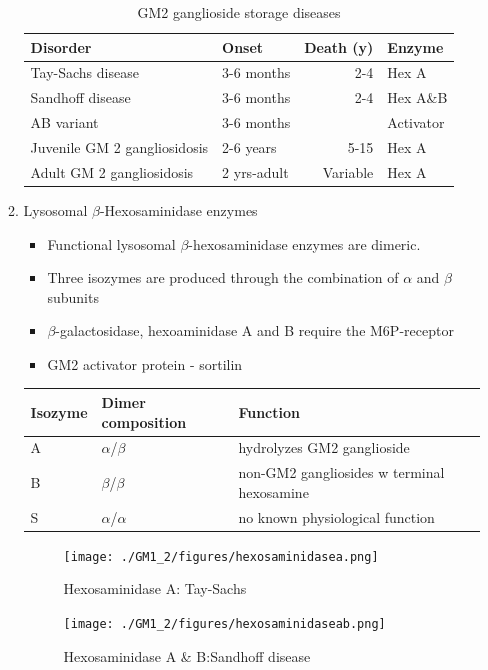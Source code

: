 \documentclass{scrartcl}
\begin{document}
\begin{enumerate}
\begin{enumerate}
\begin{table}[htbp]
\caption{\label{tab:org30b9d05}
GM2 ganglioside storage diseases}
\centering
\begin{tabular}{llrl}
Disorder & Onset & Death (y) & Enzyme\\
\hline
Tay-Sachs disease & 3-6 months & 2-4 & Hex A\\
Sandhoff disease & 3-6 months & 2-4 & Hex A\&B\\
AB variant & 3-6 months &  & Activator\\
Juvenile GM 2 gangliosidosis & 2-6 years & 5-15 & Hex A\\
Adult GM 2 gangliosidosis & 2 yrs-adult & Variable & Hex A\\
\end{tabular}
\end{table}


\item Lysosomal \(\beta\)-Hexosaminidase enzymes
\label{sec:org5da475d}

\begin{itemize}
\item Functional lysosomal \(\beta\)-hexosaminidase enzymes are dimeric.
\item Three isozymes are produced through the combination of \(\alpha\)
and \(\beta\) subunits
\item \(\beta\)-galactosidase, hexoaminidase A and B require the M6P-receptor
\item GM2 activator protein - sortilin
\end{itemize}

\begin{center}
\begin{tabular}{lll}
Isozyme & Dimer composition & Function\\
\hline
A & \(\alpha\)/\(\beta\) & hydrolyzes GM2 ganglioside\\
B & \(\beta\)/\(\beta\) & non-GM2 gangliosides w terminal hexosamine\\
S & \(\alpha\)/\(\alpha\) & no known physiological function\\
\end{tabular}
\end{center}

\begin{figure}[htbp]
\centering
\texttt{[image: ./GM1\_2/figures/hexosaminidasea.png]}
\caption{\label{fig:orgef11994}
Hexosaminidase A: Tay-Sachs}
\end{figure}


\begin{figure}[htbp]
\centering
\texttt{[image: ./GM1\_2/figures/hexosaminidaseab.png]}
\caption{\label{fig:orgb3fc389}
Hexosaminidase A \& B:Sandhoff disease}
\end{figure}




\end{enumerate}
\end{enumerate}
\end{document}
